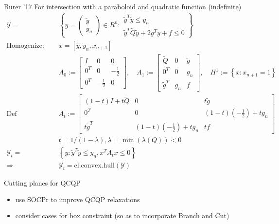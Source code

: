 \begin{frame}{Burer '17}
  For intersection with a paraboloid and quadratic function (indefinite)
  \begin{align*}
    \mathcal Y         = \quad  & \left\{y=\left(\begin{array}{c}
        \tilde{y} \\
        y_{n}
      \end{array}\right) \in R ^{n}: \begin{array}{c}
      \tilde{y}^{T} \tilde{y} \leq y_{n} \\
      \tilde{y}^{T} \tilde{Q} \tilde{y}+2 g^{T} y+f \leq 0
    \end{array}\right\}                      \\
    \textrm{Homogenize: } \quad & x = [\tilde y, y_n, x_{n+1}]                                                                                       \\
                                & A_{0}:=\begin{bmatrix}
      I     & 0            & 0            \\
      0^{T} & 0            & -\frac{1}{2} \\
      0^{T} & -\frac{1}{2} & 0
    \end{bmatrix}, \quad A_{1}:=\begin{bmatrix}
      \tilde{Q}     & 0     & \tilde{g} \\
      0^{T}         & 0     & g_{n}     \\
      \tilde{g}^{T} & g_{n} & f
    \end{bmatrix}, \quad H^{1}:=\left\{x: x_{n+1}=1\right\} \\
    \textrm{Def} \quad          & A_{t}:=\begin{bmatrix}
      (1-t) I+t \tilde{Q} & 0                                      & t \tilde{g}                            \\
      0^{T}               & 0                                      & (1-t)\left(-\frac{1}{2}\right)+t g_{n} \\
      t \tilde{g}^{T}     & (1-t)\left(-\frac{1}{2}\right)+t g_{n} & t f
    \end{bmatrix}                                                                                   \\
                                & t = 1 /(1-\lambda), \lambda = \min(\lambda(Q)) < 0                                                                 \\
    \mathcal Y_t = \quad        & \left\{y : \tilde{y}^{T} \tilde{y} \leq y_{n}, x^TA_t x \le 0 \right\}                                             \\
    \Rightarrow \quad           & \mathcal Y_t = \textrm{cl.convex.hull}( \mathcal Y)
  \end{align*}
\end{frame}
\begin{frame}{Cutting planes for QCQP}
  \begin{itemize}
    \item use SOCPr to improve QCQP relaxations
    \item consider cases for box constraint (so as to incorporate Branch and Cut)
  \end{itemize}
\end{frame}
